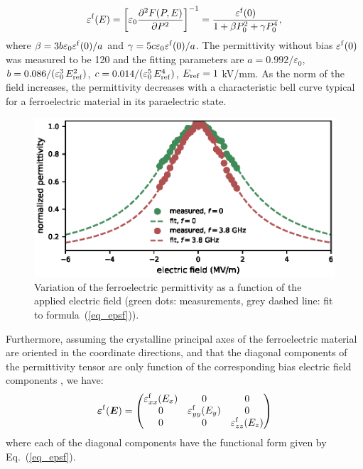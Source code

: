\documentclass[%
 reprint,
 amsmath,amssymb,
 aps,
]{revtex4-2}
\newcommand{\B}{\boldsymbol}
\newcommand{\tens}[1]{\B{#1}}
\newcommand{\epsf}{\varepsilon^{\rm f}}
\newcommand{\epsftens}{\tens{\varepsilon}^{\rm f}}
\newcommand{\epsvac}{\varepsilon_{0}}
\newcommand{\equ}[1]{Eq.~(\ref{#1})}
\begin{document}
\begin{equation}
  \epsf(E) = \left[\epsvac \frac{\partial^2 F (P, E)}{\partial P^2} \right]^{-1} = \frac{\epsf(0)}{1 + \beta P_0^2 + \gamma P_0^4},
  \label{eq_epsf}
\end{equation}
where $\beta = 3 b \epsvac \epsf(0) /a$ and  $\gamma = 5 c \epsvac \epsf(0) /a$.
The permittivity without bias $\epsf(0)$ was measured to be 120 and the fitting parameters
are $a = 0.992/\epsvac$, $b=0.086/(\epsvac^3\,E_{\rm ref}^2)$, $c=0.014/(\epsvac^5\,E_{\rm ref}^4)$, $E_{\rm ref}=1$ kV/mm.
As the norm of the field increases, the permittivity decreases with a characteristic
bell curve typical for a ferroelectric material in its paraelectric state.
\begin{figure}[!t]
\centering
\includegraphics[width=1\columnwidth]{epsilon_fit}
\caption{Variation of the ferroelectric permittivity as a function of the
 applied electric field (green dots: measurements, grey dashed line: fit to
 formula~(\ref{eq_epsf})).}
\label{fig1}
\end{figure}
Furthermore, assuming the crystalline principal axes of the ferroelectric material
are oriented in the coordinate directions, and that the diagonal components of the permittivity
tensor are only function of the corresponding bias electric field components \cite{Krowne2002}, we have:
\begin{equation}
  \epsftens (\B E) =
\left(
\begin{matrix}
\epsf_{xx}(E_x) & 0 & 0 \cr
0 & \epsf_{yy}(E_y) & 0 \cr
0 & 0 & \epsf_{zz}(E_z) \cr

  \end{matrix}
  \right)
\label{eq_epsftens}
\end{equation}
where each of the diagonal components have the functional form
given by \equ{eq_epsf}.

\end{document}
